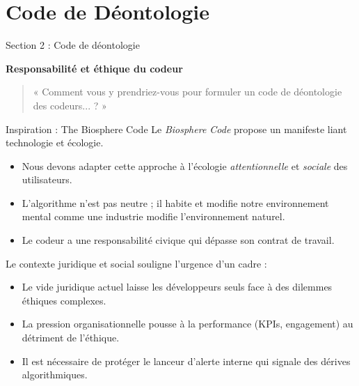 \documentclass[9pt, aspectratio=169]{beamer}
\begin{document}
\section{Code de Déontologie}

\begin{frame}{Section 2 : Code de déontologie}
    \begin{center}
        \Large \textbf{Responsabilité et éthique du codeur}
    \end{center}
    \vspace{1cm}
    \begin{quote}
        « Comment vous y prendriez-vous pour formuler un code de déontologie des codeurs... ? »
    \end{quote}
\end{frame}

\begin{frame}{Inspiration : The Biosphere Code}
    Le \textit{Biosphere Code} \parencite{Biosphere2015} propose un manifeste liant technologie et écologie.
    \begin{itemize}
        \item Nous devons adapter cette approche à l'écologie \textit{attentionnelle} et \textit{sociale} des utilisateurs.
        \item L'algorithme n'est pas neutre ; il habite et modifie notre environnement mental comme une industrie modifie l'environnement naturel.
        \item Le codeur a une responsabilité civique qui dépasse son contrat de travail.
    \end{itemize}
\end{frame}

\begin{frame}{Le contexte juridique et social}
    \cite{Neuer2024Le} souligne l'urgence d'un cadre :
    \begin{itemize}
        \item Le vide juridique actuel laisse les développeurs seuls face à des dilemmes éthiques complexes.
        \item La pression organisationnelle pousse à la performance (KPIs, engagement) au détriment de l'éthique.
        \item Il est nécessaire de protéger le lanceur d'alerte interne qui signale des dérives algorithmiques.
    \end{itemize}
\end{frame}
\end{document}

